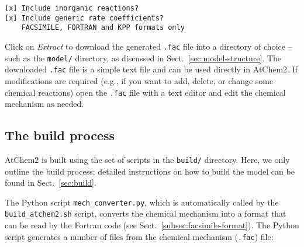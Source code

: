 \begin{verbatim}
[x] Include inorganic reactions?
[x] Include generic rate coefficients?
    FACSIMILE, FORTRAN and KPP formats only
\end{verbatim}

Click on \emph{Extract} to download the generated \texttt{.fac} file
into a directory of choice -- such as the \texttt{model/} directory,
as discussed in Sect.~\ref{sec:model-structure}. The downloaded
\texttt{.fac} file is a simple text file and can be used directly in
AtChem2. If modifications are required (e.g., if you want to add,
delete, or change some chemical reactions) open the \texttt{.fac} file
with a text editor and edit the chemical mechanism as needed.

\subsection{The build process} \label{subsec:build-process}

AtChem2 is built using the set of scripts in the \texttt{build/}
directory. Here, we only outline the build process; detailed
instructions on how to build the model can be found in
Sect.~\ref{sec:build}.

The Python script \texttt{mech\_converter.py}, which is automatically
called by the \texttt{build\_atchem2.sh} script, converts the chemical
mechanism into a format that can be read by the Fortran code (see
Sect.~\ref{subsec:facsimile-format}). The Python script generates a
number of files from the chemical mechanism (\texttt{.fac}) file:

